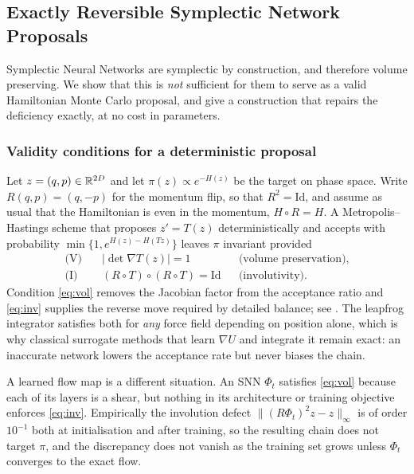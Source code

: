 %   

\subsection{Exactly Reversible Symplectic Network Proposals}
\label{sec:symmetrization}

Symplectic Neural Networks are symplectic by construction, and therefore
volume preserving. We show that this is \emph{not} sufficient for them to
serve as a valid Hamiltonian Monte Carlo proposal, and give a construction
that repairs the deficiency exactly, at no cost in parameters.

\subsubsection{Validity conditions for a deterministic proposal}

Let $z = (q,p) \in \mathbb{R}^{2D}$ and let $\pi(z) \propto e^{-H(z)}$ be the target on
phase space. Write $R(q,p) = (q,-p)$ for the momentum flip, so that
$R^2 = \mathrm{Id}$, and assume as usual that the Hamiltonian is even in the
momentum, $H \circ R = H$. A Metropolis--Hastings scheme that proposes
$z' = T(z)$ deterministically and accepts with probability
$\min\{1, e^{H(z) - H(T z)}\}$ leaves $\pi$ invariant provided
\begin{align}
    \text{(V)} \quad & |\det \nabla T(z)| = 1 &&\text{(volume preservation),} \label{eq:vol}\\
    \text{(I)} \quad & (R \circ T) \circ (R \circ T) = \mathrm{Id} &&\text{(involutivity).} \label{eq:inv}
\end{align}
Condition \eqref{eq:vol} removes the Jacobian factor from the acceptance ratio
and \eqref{eq:inv} supplies the reverse move required by detailed balance; see
\cite{Green1995, Tierney1998}. The leapfrog integrator satisfies both for
\emph{any} force field depending on position alone, which is why classical
surrogate methods that learn $\nabla U$ and integrate it remain exact: an
inaccurate network lowers the acceptance rate but never biases the chain.

A learned flow map is a different situation. An SNN $\Phi_t$ satisfies
\eqref{eq:vol} because each of its layers is a shear, but nothing in its
architecture or training objective enforces \eqref{eq:inv}. Empirically the
involution defect $\|(R\Phi_t)^2 z - z\|_\infty$ is of order $10^{-1}$ both at
initialisation and after training, so the resulting chain does not target
$\pi$, and the discrepancy does not vanish as the training set grows unless
$\Phi_t$ converges to the exact flow.

